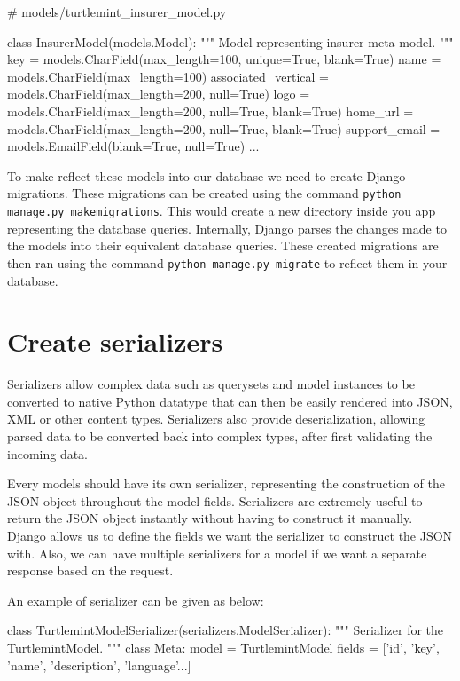 \begin{pythoncode}
# models/turtlemint_insurer_model.py
    
class InsurerModel(models.Model):
    """
    Model representing insurer meta model.
    """
    key = models.CharField(max_length=100, unique=True, blank=True)
    name = models.CharField(max_length=100)
    associated_vertical = models.CharField(max_length=200, null=True)
    logo = models.CharField(max_length=200, null=True, blank=True)
    home_url = models.CharField(max_length=200, null=True, blank=True)
    support_email = models.EmailField(blank=True, null=True)
    ...
\end{pythoncode}

To make reflect these models into our database we need to create Django
migrations. These migrations can be created using the command
\texttt{python manage.py makemigrations}. This would create a new directory
inside you app representing the database queries. Internally, Django parses
the changes made to the models into their equivalent database queries. These
created migrations are then ran using the command
\texttt{python manage.py migrate} to reflect them in your database.

\section{Create serializers}
Serializers allow complex data such as querysets and model instances to be
converted to native Python datatype that can then be easily rendered into
JSON, XML or other content types. Serializers also provide deserialization,
allowing parsed data to be converted back into complex types, after first
validating the incoming data.

Every models should have its own serializer, representing the construction of
the JSON object throughout the model fields. Serializers are extremely useful
to return the JSON object instantly without having to construct it manually.
Django allows us to define the fields we want the serializer to construct the
JSON with. Also, we can have multiple serializers for a model if we want a
separate response based on the request.

An example of serializer can be given as below:
\begin{pythoncode}
class TurtlemintModelSerializer(serializers.ModelSerializer):
    """
    Serializer for the TurtlemintModel.
    """
    class Meta:
        model = TurtlemintModel
        fields = ['id', 'key', 'name', 'description', 'language'...]
\end{pythoncode}

